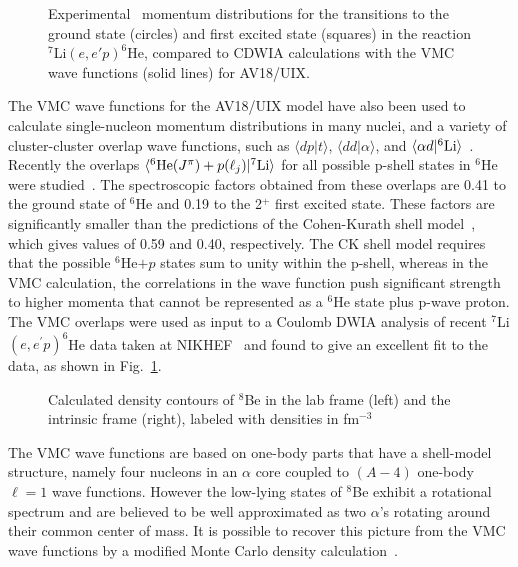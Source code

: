 \begin{figure}
\centerline{}
\caption{Experimental~\protect\cite{LWW99} momentum distributions for the 
transitions to the ground state (circles) and first excited state (squares) 
in the reaction $^7$Li$(e,e'p)^6$He, compared to CDWIA calculations with 
the VMC wave functions (solid lines) for AV18/UIX. }
\label{fig:he6p}
\end{figure}

The VMC wave functions for the AV18/UIX model have also been used to
calculate single-nucleon momentum distributions in many nuclei,
and a variety of cluster-cluster overlap wave functions, such as
$\langle d p | t \rangle$, $\langle d d | \alpha \rangle$, and $\langle
\alpha d | ^6{\rm Li} \rangle$~\cite{SPW86,FPPWSA96}.
Recently the overlaps 
$\langle^6{\rm He}(J^{\pi})+p(\ell_j)|^7{\rm Li}\rangle$ for 
all possible p-shell states in $^6$He were studied~\cite{LWW99}.
The spectroscopic factors obtained from these overlaps are 0.41 to the 
ground state of $^6$He and 0.19 to the 2$^+$ first excited state.
These factors are significantly smaller than the predictions of the 
Cohen-Kurath shell model~\cite{CK67}, which gives values of 0.59 and 0.40, 
respectively.
The CK shell model requires that the possible $^6$He$+p$ states sum to unity
within the p-shell, whereas in the VMC calculation, the correlations in 
the wave function push significant strength to higher momenta that cannot 
be represented as a $^6$He state plus p-wave proton.
The VMC overlaps were used as input to a Coulomb DWIA analysis of recent 
$^7$Li$(e,e^{\prime}p)^6$He data taken at NIKHEF~\cite{LWW99} and found to 
give an excellent fit to the data, as shown in Fig.~\ref{fig:he6p}.

\begin{figure}
\centerline{}
\caption{Calculated density contours of $^8$Be in the lab frame (left) and the
intrinsic frame (right), labeled with densities in fm$^{-3}$}
\label{fig:be8}
\end{figure}

The VMC wave functions are based on one-body parts that have
a shell-model structure, namely four nucleons in an $\alpha$ core coupled to
$(A-4)$ one-body $\ell=1$ wave functions.  However the low-lying
states of $^8$Be exhibit a rotational spectrum and are believed
to be well approximated as
two $\alpha$'s rotating around their common center of mass.
It is possible to recover this picture from the VMC wave functions by a 
modified Monte Carlo density calculation~\cite{WPCP00}.

